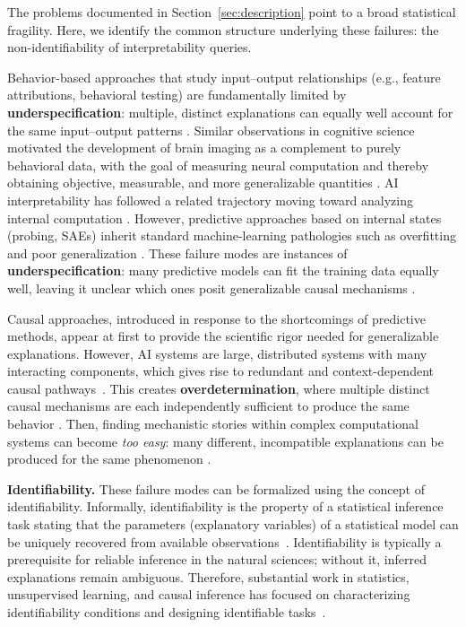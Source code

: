 The problems documented in Section~\ref{sec:description} point to a broad statistical fragility. Here, we identify the common structure underlying these failures: the non-identifiability of interpretability queries.

Behavior-based approaches that study input--output relationships (e.g., feature attributions, behavioral testing) are fundamentally limited by \textbf{underspecification}: multiple, distinct explanations can equally well account for the same input--output patterns \citep{jacovi2021contrastive,rogers2021primer,hagendorff2023machine}. Similar observations in cognitive science motivated the development of brain imaging as a complement to purely behavioral data, with the goal of measuring neural computation and thereby obtaining objective, measurable, and more generalizable quantities \citep{kosslyn1999if,logothetis2008we,churchland1988perspectives}. AI interpretability has followed a related trajectory moving toward analyzing internal computation \citep{mueller2024questrightmediatorhistory}. However, predictive approaches based on internal states (probing, SAEs) inherit standard machine-learning pathologies such as overfitting and poor generalization \citep{belinkov-2022-probing}. These failure modes are instances of \textbf{underspecification}: many predictive models can fit the training data equally well, leaving it unclear which ones posit generalizable causal mechanisms \citep{exp_unders,10.5555/3586589.3586815}.

Causal approaches, introduced in response to the shortcomings of predictive methods, appear at first to provide the scientific rigor needed for generalizable explanations. However, AI systems are large, distributed systems with many interacting components, which gives rise to redundant and context-dependent causal pathways~\citep{FrankleC19}. This creates \textbf{overdetermination}, where multiple distinct causal mechanisms are each independently sufficient to produce the same behavior \citep{doi:10.1073/pnas.91.11.5033,loosemore2012complex,sarkar2022explainableairacemodel}. Then, finding mechanistic stories within complex computational systems can become \textit{too easy}: many different, incompatible explanations can be produced for the same phenomenon \citep{lindsay2023testing,melouxeverything}.


\medskip
\noindent\textbf{Identifiability.}
These failure modes can be formalized using the concept of identifiability. Informally, identifiability is the property of a statistical inference task stating that the parameters (explanatory variables) of a statistical model can be uniquely recovered from available observations~\citep{casella2024statistical}. Identifiability is typically a prerequisite for reliable inference in the natural sciences; without it, inferred explanations remain ambiguous. Therefore, substantial work in statistics, unsupervised learning, and causal inference has focused on characterizing identifiability conditions and designing identifiable tasks~\citep{casella2024statistical,Allman2009,Locatello2019,Khemakhem2020,Shpitser2008}.


